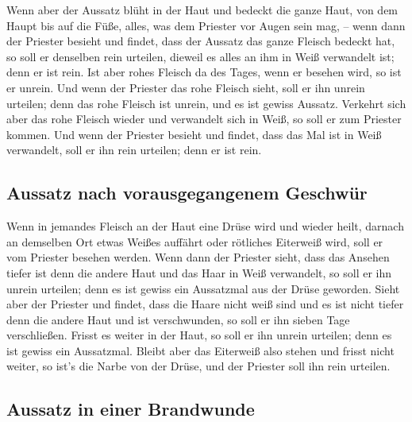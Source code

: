  Wenn aber der Aussatz blüht in der Haut und bedeckt die
ganze Haut, von dem Haupt bis auf die Füße, alles, was dem Priester vor
Augen sein mag, --  wenn dann der Priester besieht und
findet, dass der Aussatz das ganze Fleisch bedeckt hat, so soll er
denselben rein urteilen, dieweil es alles an ihm in Weiß verwandelt ist;
denn er ist rein.  Ist aber rohes Fleisch da des Tages,
wenn er besehen wird, so ist er unrein.  Und wenn der
Priester das rohe Fleisch sieht, soll er ihn unrein urteilen; denn das
rohe Fleisch ist unrein, und es ist gewiss Aussatz. 
Verkehrt sich aber das rohe Fleisch wieder und verwandelt sich in Weiß,
so soll er zum Priester kommen.  Und wenn der Priester
besieht und findet, dass das Mal ist in Weiß verwandelt, soll er ihn
rein urteilen; denn er ist rein.

\hypertarget{aussatz-nach-vorausgegangenem-geschwuxfcr}{%
\subsection{Aussatz nach vorausgegangenem
Geschwür}\label{aussatz-nach-vorausgegangenem-geschwuxfcr}}

 Wenn in jemandes Fleisch an der Haut eine Drüse wird und
wieder heilt,  darnach an demselben Ort etwas Weißes
auffährt oder rötliches Eiterweiß wird, soll er vom Priester besehen
werden.  Wenn dann der Priester sieht, dass das Ansehen
tiefer ist denn die andere Haut und das Haar in Weiß verwandelt, so soll
er ihn unrein urteilen; denn es ist gewiss ein Aussatzmal aus der Drüse
geworden.  Sieht aber der Priester und findet, dass die
Haare nicht weiß sind und es ist nicht tiefer denn die andere Haut und
ist verschwunden, so soll er ihn sieben Tage verschließen.
 Frisst es weiter in der Haut, so soll er ihn unrein
urteilen; denn es ist gewiss ein Aussatzmal.  Bleibt aber
das Eiterweiß also stehen und frisst nicht weiter, so ist's die Narbe
von der Drüse, und der Priester soll ihn rein urteilen.

\hypertarget{aussatz-in-einer-brandwunde}{%
\subsection{Aussatz in einer
Brandwunde}\label{aussatz-in-einer-brandwunde}}

